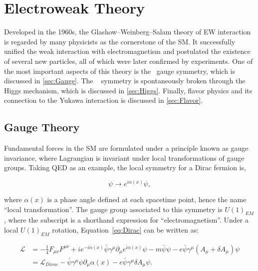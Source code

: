 \chapter{Electroweak Theory}
\label{chap:SM}

Developed in the 1960s, the Glashow–Weinberg–Salam theory of \ac{EW} interaction is regarded by many physicists as the cornerstone of the \ac{SM}. It successfully unified the weak interaction with electromagnetism and postulated the existence of several new particles, all of which were later confirmed by experiments. One of the most important aspects of this theory is the \ew~gauge symmetry, which is discussed in \autoref{sec:Gauge}. The \ew~ symmetry is spontaneously broken through the Higgs mechanism, which is discussed in \autoref{sec:Higgs}. Finally, flavor physics and its connection to the Yukawa interaction is discussed in \autoref{sec:Flavor}. 

\section{Gauge Theory}
\label{sec:Gauge}

Fundamental forces in the \ac{SM} are formulated under a principle known as gauge invariance, where Lagrangian is invariant under local transformations of gauge groups. Taking \ac{QED} as an example, the local symmetry for a Dirac fermion is,

\begin{equation}
\psi\rightarrow e^{i\alpha(x)}\psi,
\end{equation}

where $\alpha(x)$ is a phase angle defined at each spacetime point, hence the name ``local transformation''. The gauge group associated to this symmetry is $U(1)_{EM}$, where the subscript is a shorthand expression for ``electromagnetism''. Under a local $U(1)_{EM}$ rotation, Equation~\ref{eq:Dirac} can be written as:

\begin{equation}
\begin{split}
\label{eq:QEDGauge}
\mathcal{L}&=-\frac{1}{4}F_{\mu\nu}F^{\mu\nu}+ie^{-i\alpha(x)}\bar{\psi}\gamma^{\mu}\partial_{\mu}e^{i\alpha(x)}\psi-m\bar{\psi}\psi-e\bar{\psi}\gamma^{\mu}(A_{\mu}+\delta A_{\mu})\psi\\
&=\mathcal{L}_{Dirac}-\bar{\psi}\gamma^{\mu}\psi\partial_{\mu}\alpha(x)-e\bar{\psi}\gamma^{\mu}\delta A_{\mu}\psi.
\end{split}
\end{equation}

